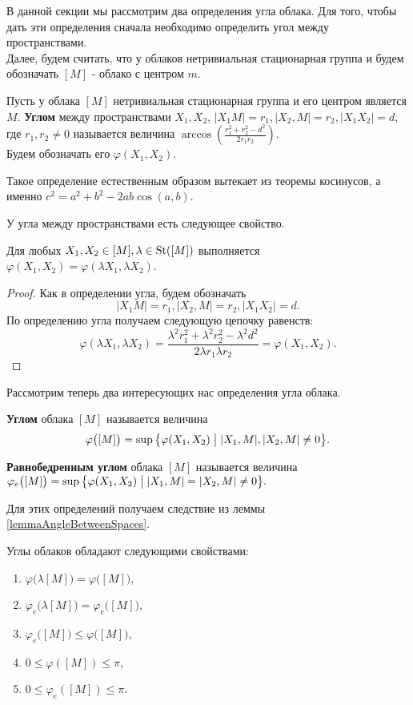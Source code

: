 В данной секции мы рассмотрим два определения угла облака. Для того,
чтобы дать эти определения сначала необходимо определить угол между
пространствами.
\\
Далее, будем считать, что у облаков нетривиальная стационарная группа
и будем обозначать $ [M] $ - облако с центром $ m $.
\begin{defin}
  Пусть у облака $ [M] $ нетривиальная стационарная группа и его
  центром является $ M $. \textbf{Углом} между пространствами $ X_1,
  X_2 $, $ |X_1 M| = r_1, | X_2, M | =r_2, |X_1 X_2| = d$, где $ r_1,
  r_2 \neq 0 $ называется величина $ \arccos \left(\frac{r_1^2 +
  r_{2}^2 - d^2}{2r_1r_2} \right)$.\\ Будем обозначать его $
  \varphi(X_1, X_2) $.
\end{defin}
\begin{remark}
  Такое определение естественным образом вытекает из теоремы
  косинусов, а именно $ c^{2} = a^2 + b^2 - 2ab\cos (a,b) $.
\end{remark}
У угла между пространствами есть следующее свойство.
\begin{lemma}
  \label{lemmaAngleBetweenSpaces}
  Для любых \( X_1, X_2 \in [M], \lambda \in \operatorname{St}([M]) \) выполняется
  \( \varphi (X_1, X_2) = \varphi (\lambda X_1, \lambda X_2) \).
\end{lemma}
\begin{proof}
  Как в определении угла, будем обозначать \[ |X_1 M| = r_1, | X_2, M
  | =r_2, |X_1 X_2| = d.\]
  По определению угла получаем следующую цепочку равенств:
  \[ \varphi (\lambda X_1, \lambda X_2) = \frac{\lambda ^{2} r_1^2 +
    \lambda ^2 r_2^2 - \lambda^2 d^2}{2 \lambda  r_1 \lambda r_2} =
  \varphi (X_1, X_2).
\]
\end{proof}
Рассмотрим теперь два интересующих нас определения угла облака.
\begin{defin}
  \textbf{Углом} облака $ [M] $ называется величина
  \[
    \varphi \big([M]\big)= \sup \big\{\varphi (X_1, X_2) \bigm| | X_1,M
    |, |X_2,M| \neq 0\big\}.
  \]
\end{defin}
\begin{defin}
  \textbf{Равнобедренным углом} облака $ [M] $ называется величина
  \(
    \varphi_e \big([M]\big) = \sup \big\{\varphi (X_1, X_2) \bigm|
    |X_1,M | = |X_2,M| \neq 0\big\}.
  \)
\end{defin}
Для этих определений получаем следствие из леммы \ref{lemmaAngleBetweenSpaces}.
\begin{lemma}
  Углы облаков обладают следующими свойствами:
  \begin{enumerate}
    \item \(\varphi \big(\lambda [M]\big) = \varphi \big([M]\big)\),
    \item \(\varphi_e \big(\lambda [M]\big) = \varphi_e \big([M]\big)\),
    \item \( \varphi_e \big([M]\big) \le \varphi \big([M]\big) \),
    \item \(0 \le \varphi ([M]) \le \pi\),
    \item \(0 \le \varphi_e ([M]) \le \pi\).
  \end{enumerate}
\end{lemma}
